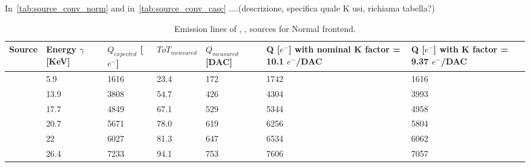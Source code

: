 In~\autoref{tab:source_conv_norm} and in~\autoref{tab:source_conv_casc}   ....(descrizione, specifica quale K usi, richiama tabella?)

\begin{table}[h!]
\centering
\begin{tabular}{C{1.5cm}|C{1.8cm}|C{1.8cm}|C{1.8cm}|C{1.8cm}|C{1.8cm}|C{1.8cm}}
\hline
Source & Energy $\gamma$ [KeV] & $Q_{expected}$ [$e^{-}$] & $ToT_{measured}$ & $Q_{measured}$ [DAC] & Q [$e^{-}$] \footnotesize{with nominal K factor = 10.1 $e^{-}$/DAC} & Q [$e^{-}$] \footnotesize{with  K factor = 9.37 $e^{-}$/DAC}\\[2ex]
\hline
\hline
{} & 5.9 & 1616 & 23.4 & 172 & 1742 & 1616 \\[0.5ex]
\hline
{} & 13.9 & 3808 & 54.7 & 426 & 4304 & 3993 \\[0.5ex]
\hline
{} & 17.7 & 4849 & 67.1 & 529 & 5344 & 4958 \\[0.5ex]
\hline
{} & 20.7 & 5671 & 78.0 & 619 & 6256 & 5804 \\[0.5ex]
\hline
{} & 22 & 6027 & 81.3 & 647 & 6534 & 6062 \\[0.5ex]
\hline
{} & 26.4 & 7233 & 94.1 & 753 & 7606 & 7057 \\[0.5ex]
\hline
\hline
\end{tabular}
\caption{Emission lines of , ,  sources for Normal frontend.}
\label{tab:source_conv_norm}
\end{table}


